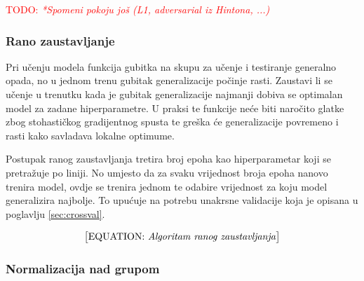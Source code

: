 \documentclass[times, utf8, numeric, diplomski]{fer}
\def\TODO#1{\noindent\textcolor{red}{TODO: \textit{#1}}\newline}
\def\todo#1{\TODO{#1}}
\def\todoeq#1{\textcolor{red}{\begin{equation}\text{\big[EQUATION: \textit{#1}\big]}\end{equation}}}
\begin{document}
\todo{*Spomeni pokoju još (L1, adversarial iz Hintona, ...)}
%

\subsubsection{Rano zaustavljanje}
Pri učenju modela funkcija gubitka na skupu za učenje i testiranje generalno opada, no u jednom trenu gubitak generalizacije počinje rasti. Zaustavi li se učenje u trenutku kada je gubitak generalizacije najmanji dobiva se optimalan model za zadane hiperparametre. U praksi te funkcije neće biti naročito glatke zbog stohastičkog gradijentnog spusta te greška će generalizacije povremeno i rasti kako savladava lokalne optimume.

Postupak ranog zaustavljanja tretira broj epoha kao hiperparametar koji se pretražuje po liniji. No umjesto da za svaku vrijednost broja epoha nanovo trenira model, ovdje se trenira jednom te odabire vrijednost za koju model generalizira najbolje. To upućuje na potrebu unakrsne validacije koja je opisana u poglavlju \ref{sec:crossval}.

\todoeq{Algoritam ranog zaustavljanja}

\subsubsection{Normalizacija nad grupom}
\end{document}

